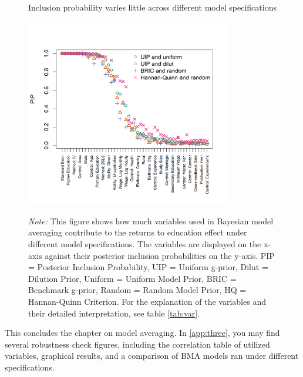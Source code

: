 \begin{figure}[!t]
\begin{center}
\caption{Inclusion probability varies little across different model specifications}
\label{fig:BMA_comparison}
\includegraphics[width=0.8\textwidth]{Figures/BMA/bma_comparison.png}
\end{center}\vspace{-0.5cm}
\captionsetup{width=0.8\textwidth, font = scriptsize}
\caption*{\emph{Note:} This figure shows how much variables used in Bayesian model averaging contribute to the returns to education effect under different model specifications. The variables are displayed on the x-axis against their posterior inclusion probabilities on the y-axis. PIP = Posterior Inclusion Probability, UIP = Uniform g-prior, Dilut = Dilution Prior, Uniform = Uniform Model Prior, BRIC = Benchmark g-prior, Random = Random Model Prior, HQ = Hannan-Quinn Criterion. For the explanation of the variables and their detailed interpretation, see table \ref{tab:var}.}
\end{figure}

This concludes the chapter on model averaging. In \autoref{app:three}, you may find several robustness check figures, including the correlation table of utilized variables, graphical results, and a comparison of \ac{BMA} models ran under different specifications.

